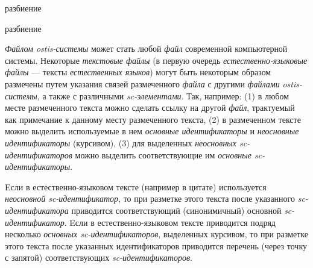 \begin{SCn}

    \begin{scnrelfromset}{разбиение}
    \end{scnrelfromset}
    \begin{scnrelfromset}{разбиение}
            \begin{scnindent}
            \scnidtf{обозначение одного из вхождений (однорго из экземпляров) информационной конструкции]}
            \end{scnindent}
            \begin{scnindent}
            \end{scnindent}
    \end{scnrelfromset}

\end{SCn}

    \textit{Файлом ostis-системы} может стать любой \textit{файл} современной компьютерной системы.
    Некоторые \textit{текстовые файлы} (в первую очередь \textit{естественно-языковые файлы} --- тексты \textit{естественных языков}) могут быть некоторым образом размечены путем указания связей размеченного \textit{файла} с другими \textit{файлами} \textit{ostis-системы}, а также с различными \textit{sc-элементами}.
    Так, например: (1) в любом месте размеченного текста можно сделать ссылку на другой \textit{файл}, трактуемый как примечание к данному месту размеченного текста, (2) в размеченном тексте можно выделить используемые в нем \textit{основные идентификаторы} и \textit{неосновные идентификаторы} (курсивом), (3) для выделенных \textit{неосновных sc-идентификаторов} можно выделить соответствующие им \textit{основные sc-идентификаторы}.

    Eсли в естественно-языковом тексте (например в цитате) используется \textit{неосновной sc-идентификатор}, то при разметке этого текста после указанного \textit{sc-идентификатора} приводится соответствующий (синонимичный) основной \textit{sc-идентификатор}.
    Eсли в естественно-языковом тексте приводится подряд несколько \textit{основных sc-идентификаторов}, выделенных курсивом, то при разметке этого текста после указанных идентификаторов приводится перечень (через точку с запятой) соответствующих \textit{sc-идентификаторов}.

